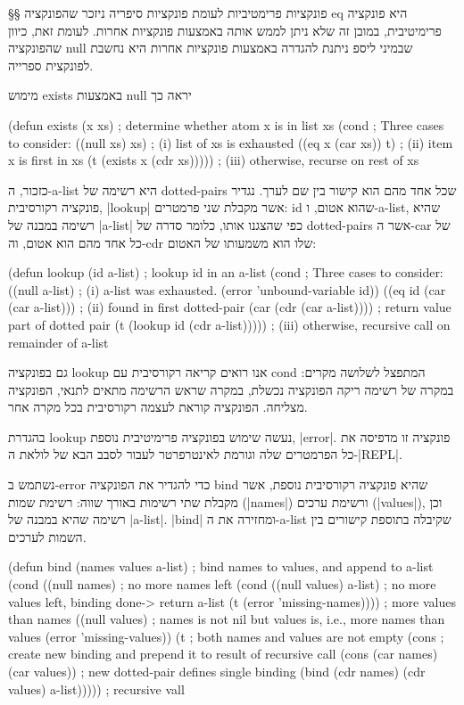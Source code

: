 §§ פונקציות פרימטיביות לעומת פונקציות סיפריה
ניזכר שהפונקציה eq היא פונקציה פרימיטיבית, במובן זה שלא ניתן לממש אותה באמצעות
פונקציות אחרות. לעומת זאת, כיוון שהפונקציה null שבמיני ליספ ניתנת להגדרה
באמצעות פונקציות אחרות היא נחשבת לפונקצית ספרייה.

מימוש exists באמצעות null יראה כך
\begin{KERNEL}
(defun exists (x xs) ; determine whether atom x is in list xs
  (cond ; Three cases to consider:
    ((null xs) xs) ; (i) list of xs is exhausted
    ((eq x (car xs)) t) ; (ii) item x is first in xs
    (t (exists x (cdr xs))))) ; (iii) otherwise, recurse on rest of xs
\end{KERNEL}

כזכור, ה-a-list היא רשימה של dotted-pairs שכל אחד מהם הוא קישור בין שם לערך.
נגדיר פונקציה רקורסיבית, \E|lookup| אשר מקבלת שני פרמטרים: id שהוא אטום,
ו-a-list, שהיא רשימה במבנה של \E|a-list| כפי שהצגנו אותו, כלומר סדרה של
dotted-pairs אשר ה-car של כל אחד מהם הוא אטום, וה-cdr שלו הוא משמעותו של האטום:
\begin{KERNEL}
(defun lookup (id a-list) ; lookup id in an a-list
  (cond ; Three cases to consider:
    ((null a-list) ; (i) a-list was exhausted.
      (error 'unbound-variable id))
    ((eq id (car (car a-list))) ; (ii) found in first dotted-pair
      (car (cdr (car a-list)))) ; return value part of dotted pair
    (t (lookup id (cdr a-list))))) ; (iii) otherwise, recursive call on remainder of a-list
\end{KERNEL}
גם בפונקציה lookup אנו רואים קריאה רקורסיבית עם cond המתפצל לשלושה מקרים: במקרה
של רשימה ריקה הפונקציה נכשלת, במקרה שראש הרשימה מתאים לתנאי, הפונקציה מצליחה.
הפונקציה קוראת לעצמה רקורסיבית בכל מקרה אחר.

בהגדרת lookup נעשה שימוש בפונקציה פרימיטיבית נוספת, \E|error|. פונקציה זו
מדפיסה את כל הפרמטרים שלה וגורמת לאינטרפרטר לעבור לסבב הבא של לולאת ה-\E|REPL|.

נשתמש ב-error כדי להגדיר את הפונקציה bind שהיא פונקציה רקורסיבית נוספת, אשר
מקבלת שתי רשימות באורך שווה: רשימת שמות (\E|names|) ורשימת ערכים (\E|values|),
וכן רשימה שהיא במבנה של \E|a-list|. \E|bind| ומחזירה את ה-a-list
שקיבלה בתוספת קישורים בין השמות לערכים.

\begin{KERNEL}
(defun bind (names values a-list) ; bind names to values, and append to a-list
  (cond ((null names) ; no more names left
        (cond ((null values) a-list) ; no more values left, binding done-> return a-list
              (t (error 'missing-names)))) ; more values than names
        ((null values) ; names is not nil but values is, i.e., more names than values
          (error 'missing-values))
        (t ; both names and values are not empty
          (cons ; create new binding and prepend it to result of recursive call
            (cons (car names) (car values)) ; new dotted-pair defines single binding
            (bind (cdr names) (cdr values) a-list))))) ; recursive vall
\end{KERNEL}

